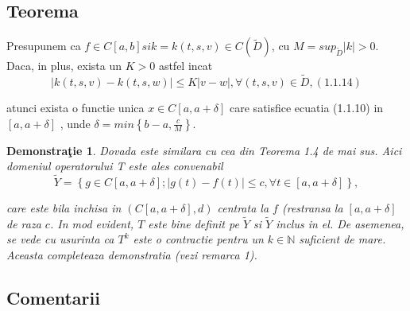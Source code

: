 \documentclass[a4paper,12pt,oneside]{report}
\newtheorem{demonstration}{Demonstra\c tie}
\begin{document}
\subsection{Teorema}

Presupunem ca \(f \in C \left [ a,b \right ] si k = k\left ( t,s,v \right ) \in C\left ( \tilde{D} \right )\), cu \(M = sup _{\tilde{D}}\left | k \right |> 0\). Daca, in plus, exista un \(K > 0\) astfel incat 
\begin{displaymath}
  \left | k\left ( t,s,v \right ) - k \left ( t,s,w \right ) \right | \leq K \left | v-w \right |, \forall \left ( t,s,v \right ) \in \tilde{D}, (1.1.14)
\end{displaymath}

atunci exista o functie unica \(x \in C \left [ a, a + \delta  \right ]\) care satisfice ecuatia (1.1.10)  in  \(\left [ a, a + \delta  \right ]\) , unde \(\delta = min \left \{ b-a, \frac{c}{M} \right \}\). 

\begin{demonstration}

Dovada este similara cu cea din Teorema 1.4 de mai sus. Aici domeniul operatorului T este ales convenabil 
\begin{displaymath}
  \tilde{Y} = \left \{ g \in C \left [ a, a+ \delta  \right ] ; \left | g\left ( t \right ) - f\left ( t \right ) \right | \leq c, \forall t \in \left [ a, a+ \delta  \right ] \right \}, 
\end{displaymath}

care este bila inchisa in \(\left ( C\left [ a, a+ \delta  \right ], d \right )\) centrata la \(f\) (restransa la \(\left [ a, a+ \delta  \right ]\) de raza \(c\). In mod evident, \(T\) este bine definit pe \(\tilde{Y}\) si \(\tilde{Y}\) inclus in el. De asemenea, se vede cu usurinta ca \(T^{k}\) este o contractie pentru un \(k \in \mathbb{N}\)  suficient de mare. Aceasta completeaza demonstratia (vezi remarca 1).   

\end{demonstration}

\subsection{Comentarii}
\end{document}
